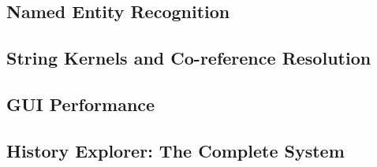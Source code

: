 \subsection{Named Entity Recognition}
\label{sec:eval:named_entity_recognition}


\subsection{String Kernels and Co-reference Resolution}
\label{sec:eval:string_kernels_and_co-reference_resolution}


\subsection{GUI Performance}
\label{sec:eval:gui_performance}


\subsection{History Explorer: The Complete System}
\label{sec:eval:everything}
